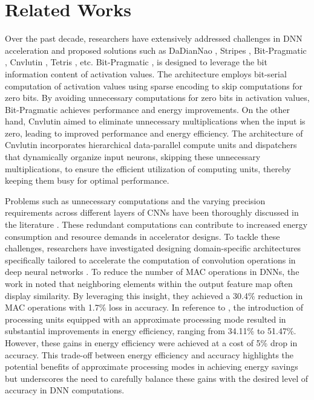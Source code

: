 \documentclass[conference]{IEEEtran}
\begin{document}
\section{Related Works}\label{sec: Lit_Review}

Over the past decade, researchers have extensively addressed challenges in DNN acceleration and proposed solutions such as DaDianNao \cite{luo2016dadiannao}, Stripes \cite{judd2016stripes}, Bit-Pragmatic \cite{albericio2017bitpragmatic}, Cnvlutin \cite{albericio2016cnvlutin}, Tetris \cite{gao2017tetris}, etc. Bit-Pragmatic \cite{albericio2017bitpragmatic}, is designed to leverage the bit information content of activation values. The architecture employs bit-serial computation of activation values using sparse encoding to skip computations for zero bits. By avoiding unnecessary computations for zero bits in activation values, Bit-Pragmatic achieves performance and energy improvements. On the other hand, Cnvlutin \cite{albericio2016cnvlutin} aimed to eliminate unnecessary multiplications when the input is zero, leading to improved performance and energy efficiency. The architecture of Cnvlutin incorporates hierarchical data-parallel compute units and dispatchers that dynamically organize input neurons, skipping these unnecessary multiplications, to ensure the efficient utilization of computing units, thereby keeping them busy for optimal performance.

Problems such as unnecessary computations and the varying precision requirements across different layers of CNNs have been thoroughly discussed in the literature \cite{judd2018proteus, shin2017fixed}. These redundant computations can contribute to increased energy consumption and resource demands in accelerator designs. To tackle these challenges, researchers have investigated designing domain-specific architectures specifically tailored to accelerate the computation of convolution operations in deep neural networks \cite{jouppi2018domain, juracy2023cnn}. To reduce the number of MAC operations in DNNs, the work in \cite{shomron2018spatial} noted that neighboring elements within the output feature map often display similarity. By leveraging this insight, they achieved a 30.4\% reduction in MAC operations with 1.7\% loss in accuracy. In reference to \cite{zhang2015approxann}, the introduction of processing units equipped with an approximate processing mode resulted in substantial improvements in energy efficiency, ranging from 34.11\% to 51.47\%. However, these gains in energy efficiency were achieved at a cost of 5\% drop in accuracy. This trade-off between energy efficiency and accuracy highlights the potential benefits of approximate processing modes in achieving energy savings but underscores the need to carefully balance these gains with the desired level of accuracy in DNN computations.
\end{document}
